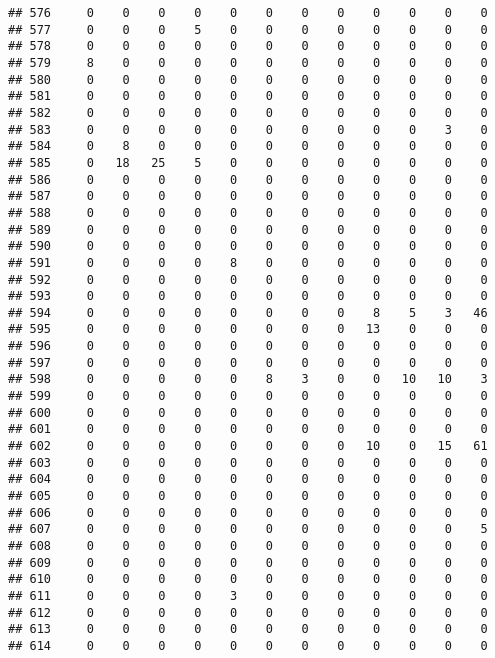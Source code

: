\documentclass[]{article}
\begin{document}
\begin{verbatim}
## 576     0    0    0    0    0    0    0    0    0    0    0    0
## 577     0    0    0    5    0    0    0    0    0    0    0    0
## 578     0    0    0    0    0    0    0    0    0    0    0    0
## 579     8    0    0    0    0    0    0    0    0    0    0    0
## 580     0    0    0    0    0    0    0    0    0    0    0    0
## 581     0    0    0    0    0    0    0    0    0    0    0    0
## 582     0    0    0    0    0    0    0    0    0    0    0    0
## 583     0    0    0    0    0    0    0    0    0    0    3    0
## 584     0    8    0    0    0    0    0    0    0    0    0    0
## 585     0   18   25    5    0    0    0    0    0    0    0    0
## 586     0    0    0    0    0    0    0    0    0    0    0    0
## 587     0    0    0    0    0    0    0    0    0    0    0    0
## 588     0    0    0    0    0    0    0    0    0    0    0    0
## 589     0    0    0    0    0    0    0    0    0    0    0    0
## 590     0    0    0    0    0    0    0    0    0    0    0    0
## 591     0    0    0    0    8    0    0    0    0    0    0    0
## 592     0    0    0    0    0    0    0    0    0    0    0    0
## 593     0    0    0    0    0    0    0    0    0    0    0    0
## 594     0    0    0    0    0    0    0    0    8    5    3   46
## 595     0    0    0    0    0    0    0    0   13    0    0    0
## 596     0    0    0    0    0    0    0    0    0    0    0    0
## 597     0    0    0    0    0    0    0    0    0    0    0    0
## 598     0    0    0    0    0    8    3    0    0   10   10    3
## 599     0    0    0    0    0    0    0    0    0    0    0    0
## 600     0    0    0    0    0    0    0    0    0    0    0    0
## 601     0    0    0    0    0    0    0    0    0    0    0    0
## 602     0    0    0    0    0    0    0    0   10    0   15   61
## 603     0    0    0    0    0    0    0    0    0    0    0    0
## 604     0    0    0    0    0    0    0    0    0    0    0    0
## 605     0    0    0    0    0    0    0    0    0    0    0    0
## 606     0    0    0    0    0    0    0    0    0    0    0    0
## 607     0    0    0    0    0    0    0    0    0    0    0    5
## 608     0    0    0    0    0    0    0    0    0    0    0    0
## 609     0    0    0    0    0    0    0    0    0    0    0    0
## 610     0    0    0    0    0    0    0    0    0    0    0    0
## 611     0    0    0    0    3    0    0    0    0    0    0    0
## 612     0    0    0    0    0    0    0    0    0    0    0    0
## 613     0    0    0    0    0    0    0    0    0    0    0    0
## 614     0    0    0    0    0    0    0    0    0    0    0    0

\end{verbatim}
\end{document}
